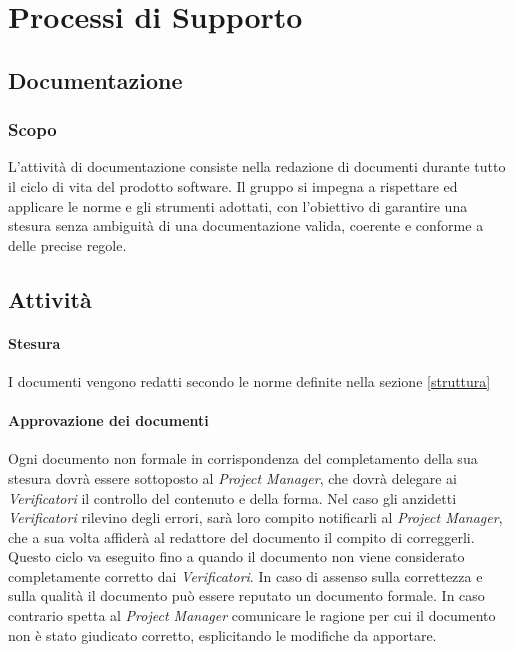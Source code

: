 \section{Processi di Supporto}


\subsection{Documentazione}

\subsubsection{Scopo}
L'attività di documentazione consiste nella redazione di documenti durante tutto il ciclo di vita del prodotto software. Il gruppo si impegna a rispettare ed applicare le norme e gli strumenti adottati, con l'obiettivo di garantire una stesura senza ambiguità di una documentazione valida, coerente e conforme a delle precise regole. 

\subsection{Attività}

\paragraph{Stesura} \Spazio 
I documenti vengono redatti secondo le norme definite nella sezione \ref{struttura} 

\paragraph{Approvazione dei documenti} \Spazio
Ogni documento non formale in corrispondenza del completamento della sua stesura dovrà essere sottoposto al \textit{Project Manager}, che dovrà delegare ai \textit{Verificatori} il controllo del contenuto e della forma. Nel caso gli anzidetti \textit{Verificatori} rilevino degli errori, sarà loro compito notificarli al \textit{Project Manager}, che a sua volta affiderà al redattore del documento il compito di correggerli. Questo ciclo va eseguito fino a quando il documento non viene considerato completamente corretto dai  \textit{Verificatori}. In caso di assenso sulla correttezza e sulla qualità il documento può essere reputato un documento formale. In caso contrario spetta al \textit{Project Manager} comunicare le ragione per cui il documento non è stato giudicato corretto, esplicitando le modifiche da apportare.

